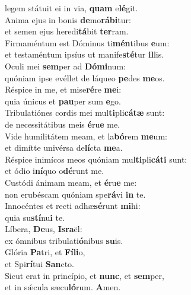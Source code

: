 \oddverse legem státuit ei in via, \textbf{quam} e\textbf{lé}git.\\
\evenverse Anima ejus in bonis \textbf{de}mo\textbf{rá}\textbf{bi}tur:~\*\\
\evenverse et semen ejus heredi\textbf{tá}bit \textbf{ter}ram.\\
\oddverse Firmaméntum est Dóminus ti\textbf{mén}tibus \textbf{e}um:~\*\\
\oddverse et testaméntum ipsíus ut manife\textbf{sté}tur \textbf{il}lis.\\
\evenverse Oculi mei \textbf{sem}per ad \textbf{Dó}\textbf{mi}num:~\*\\
\evenverse quóniam ipse evéllet de láqueo \textbf{pe}des \textbf{me}os.\\
\oddverse Réspice in me, et mise\textbf{ré}re \textbf{me}i:~\*\\
\oddverse quia únicus et \textbf{pau}per sum \textbf{e}go.\\
\evenverse Tribulatiónes cordis mei mul\textbf{ti}pli\textbf{cá}\textbf{tæ} sunt:~\*\\
\evenverse de necessitátibus meis \textbf{é}ru\textbf{e} me.\\
\oddverse Vide humilitátem meam, et la\textbf{bó}rem \textbf{me}um:~\*\\
\oddverse et dimítte univérsa de\textbf{lí}cta \textbf{me}a.\\
\evenverse Réspice inimícos meos quóniam mul\textbf{ti}pli\textbf{cá}\textbf{ti} sunt:~\*\\
\evenverse et ódio i\textbf{ní}quo o\textbf{dé}runt me.\\
\oddverse Custódi ánimam meam, et \textbf{é}ru\textbf{e} me:~\*\\
\oddverse non erubéscam quóniam spe\textbf{rá}vi \textbf{in} te.\\
\evenverse Innocéntes et recti adhæ\textbf{sé}runt \textbf{mi}hi:~\*\\
\evenverse quia su\textbf{stí}nu\textbf{i} te.\\
\oddverse Líbera, \textbf{De}us, \textbf{Is}\textbf{ra}ël:~\*\\
\oddverse ex ómnibus tribulati\textbf{ó}nibus \textbf{su}is.\\
\evenverse Glória \textbf{Pa}tri, et \textbf{Fí}\textbf{li}o,~\*\\
\evenverse et Spi\textbf{rí}tui \textbf{San}cto.\\
\oddverse Sicut erat in princípio, et \textbf{nunc}, et \textbf{sem}per,~\*\\
\oddverse et in sǽcula sæcu\textbf{ló}rum. \textbf{A}men.\\

